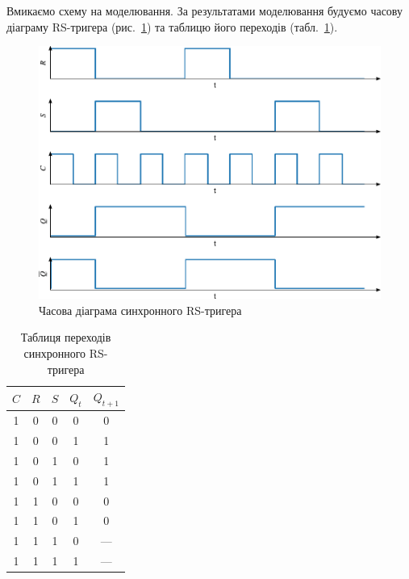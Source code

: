 \documentclass[a4paper,oneside,DIV=10,12pt]{scrartcl}
\begin{document}
			Вмикаємо схему на моделювання. За результатами моделювання будуємо часову діаграму RS-тригера (рис.~\ref{fig:rsc-flipflop-dynamic-mode-plot}) та таблицю його переходів (табл.~\ref{tab:rsc-flipflop-excitation-table}).
			
			\begin{figure}[!htbp]
			\centering
				\includegraphics[width = \textwidth]{plots/02-pdf/02-rsc-edited.pdf}
			\caption{Часова діаграма синхронного RS-тригера}
			\label{fig:rsc-flipflop-dynamic-mode-plot}
			\end{figure}
			
			\begin{table}[!htbp]
			\centering
				\begin{tabular}{ccccc}
					\toprule
						$C$ & $R$ & $S$ & $Q_t$ & $Q_{t + 1}$\\
					\midrule
						1 & 0 & 0 & 0 & 0\\
						1 & 0 & 0 & 1 & 1\\
						1 & 0 & 1 & 0 & 1\\
						1 & 0 & 1 & 1 & 1\\
						1 & 1 & 0 & 0 & 0\\
						1 & 1 & 0 & 1 & 0\\
						1 & 1 & 1 & 0 & —\\
						1 & 1 & 1 & 1 & —\\
					\bottomrule
				\end{tabular}
			\caption{Таблиця переходів синхронного RS-тригера}
			\label{tab:rsc-flipflop-excitation-table}
			\end{table}
			
\end{document}
